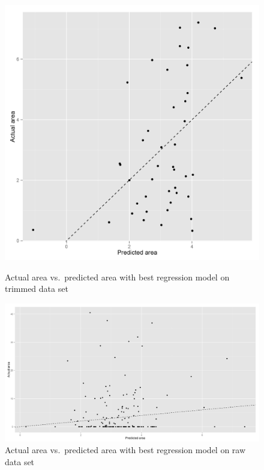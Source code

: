 \documentclass{article}
\begin{document}
\begin{figure}
  \begin{minipage}[b]{0.45\linewidth}
  \centering
  \includegraphics[width=\textwidth]{figures/goodfiresowndat.png}
  \caption{Actual area vs.\ predicted area with best regression model on
  trimmed data set}
  \label{fig:linreggood1}
\end{minipage}
\hspace{0.5cm}
  \begin{minipage}[b]{0.45\linewidth}
  \centering
  \includegraphics[width=\textwidth]{figures/goodfiresalldat.png}
  \caption{Actual area vs.\ predicted area with best regression model on raw
  data set}
  \label{fig:linreggood2}
\end{minipage}
\end{figure}
\end{document}
